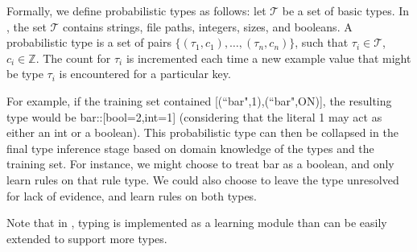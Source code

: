 Formally, we define probabilistic types as follows: let $\mathcal{T}$ be a set of basic types.
In \app, the set $\mathcal{T}$ contains strings, file paths, integers, sizes, and booleans. 
A probabilistic type is a set of pairs $\{(\tau_1, c_1),\ldots,(\tau_n, c_n)\}$, such that $\tau_i \in \mathcal{T}$, $c_i \in \mathbb{Z}$. 
The count for $\tau_i$ is incremented each time a new example value that might be type $\tau_i$ is encountered for a particular key.

For example, if the training set contained [(``bar",1),(``bar",ON)], the resulting type would be bar::[bool=2,int=1] (considering that the literal 1 may act as either an int or a boolean).
This probabilistic type can then be collapsed in the final type inference stage based on domain knowledge of the types and the training set.
For instance, we might choose to treat bar as a boolean, and only learn rules on that rule type.
We could also choose to leave the type unresolved for lack of evidence, and learn rules on both types.

Note that in \app, typing is implemented as a learning module than can be easily extended to support more types. 




